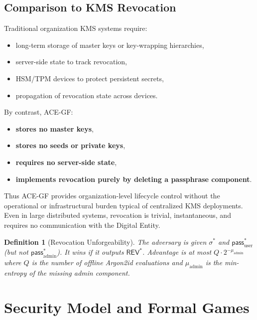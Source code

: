 \documentclass[12pt,a4paper]{article}
\newtheorem{definition}{Definition}
\begin{document}
  \subsection{Comparison to KMS Revocation}

  Traditional organization KMS systems require:

  \begin{itemize}
   \item long-term storage of master keys or key-wrapping hierarchies,
   \item server-side state to track revocation,
   \item HSM/TPM devices to protect persistent secrets,
   \item propagation of revocation state across devices.
  \end{itemize}

  By contrast, ACE-GF:

  \begin{itemize}
   \item \textbf{stores no master keys},
   \item \textbf{stores no seeds or private keys},
   \item \textbf{requires no server-side state},
   \item \textbf{implements revocation purely by deleting a passphrase component}.
  \end{itemize}

  Thus ACE-GF provides organization-level lifecycle control without the
  operational or infrastructural burden typical of centralized KMS deployments.
  Even in large distributed systems, revocation is trivial, instantaneous, and
  requires no communication with the Digital Entity.


  \begin{definition}[Revocation Unforgeability]
   The adversary is given $\sigma^*$ and $\mathsf{pass}_{\text{user}}^*$ (but not $\mathsf{pass}_{\text{admin}}^*$). It wins if it outputs $\mathsf{REV}^*$.
   Advantage is at most $Q \cdot 2^{-\mu_{\text{admin}}}$ where $Q$ is the number of offline Argon2id evaluations and $\mu_{\text{admin}}$ is the min-entropy of the missing admin component.
  \end{definition}



  \section{Security Model and Formal Games}
\end{document}
